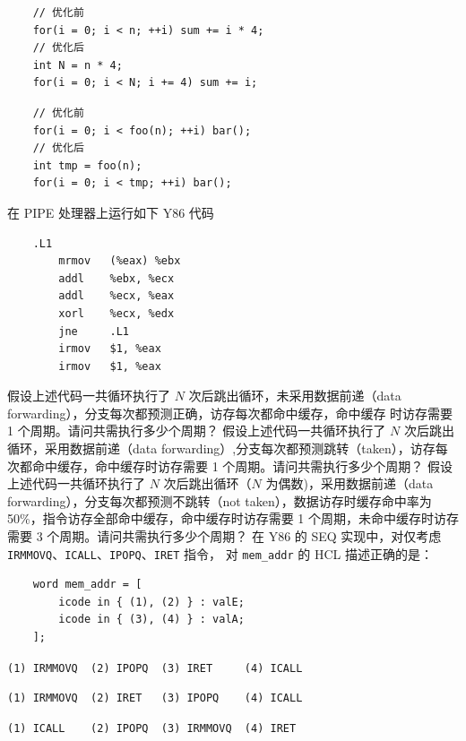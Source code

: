 \begin{problems}
\begin{choices}
            \item \begin{verbatim}
    // 优化前
    for(i = 0; i < n; ++i) sum += i * 4;
    // 优化后
    int N = n * 4;
    for(i = 0; i < N; i += 4) sum += i;
            \end{verbatim}
            \item \begin{verbatim}
    // 优化前
    for(i = 0; i < foo(n); ++i) bar();
    // 优化后
    int tmp = foo(n);
    for(i = 0; i < tmp; ++i) bar();
            \end{verbatim}
        \end{choices}
         在 PIPE 处理器上运行如下 Y86 代码
        \begin{verbatim}
    .L1
        mrmov   (%eax) %ebx
        addl    %ebx, %ecx
        addl    %ecx, %eax
        xorl    %ecx, %edx
        jne     .L1
        irmov   $1, %eax
        irmov   $1, %eax
        \end{verbatim}
            \qn 假设上述代码一共循环执行了 $N$ 次后跳出循环，未采用数据前递（data forwarding），分支每次都预测正确，访存每次都命中缓存，命中缓存 时访存需要 1 个周期。请问共需执行多少个周期？
            \qn 假设上述代码一共循环执行了 $N$ 次后跳出循环，采用数据前递（data forwarding）,分支每次都预测跳转（taken），访存每次都命中缓存，命中缓存时访存需要 1 个周期。请问共需执行多少个周期？
            \qn 假设上述代码一共循环执行了 $N$ 次后跳出循环（$N$ 为偶数)，采用数据前递（data forwarding），分支每次都预测不跳转（not taken），数据访存时缓存命中率为 50\%，指令访存全部命中缓存，命中缓存时访存需要 1 个周期，未命中缓存时访存需要 3 个周期。请问共需执行多少个周期？
         在 Y86 的 SEQ 实现中，对仅考虑 \verb|IRMMOVQ|、\verb|ICALL|、\verb|IPOPQ|、\verb|IRET| 指令， 对 \verb|mem_addr| 的 HCL 描述正确的是：
        \begin{verbatim}
    word mem_addr = [
        icode in { (1), (2) } : valE;
        icode in { (3), (4) } : valA;
    ];
        \end{verbatim}
        \begin{choices}
            \item \verb|(1) IRMMOVQ  (2) IPOPQ  (3) IRET     (4) ICALL|
            \item \verb|(1) IRMMOVQ  (2) IRET   (3) IPOPQ    (4) ICALL|
            \item \verb|(1) ICALL    (2) IPOPQ  (3) IRMMOVQ  (4) IRET|

\end{choices}
\end{problems}
